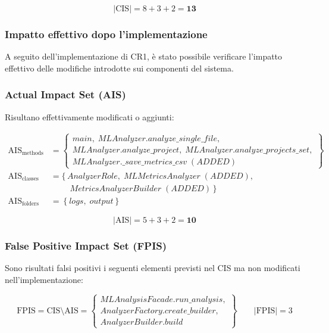 \documentclass[11pt,a4paper]{article}
\makeatletter
\newif\ifmark@prevlower
\def\mark@casebreak#1{%
  \ifcat\noexpand#1\relax
    \mark@prevlowerfalse
  \else
    \ifnum`#1=\uccode`#1\relax
      \ifmark@prevlower\allowbreak\fi
      \mark@prevlowerfalse
    \else
      \ifnum`#1=\lccode`#1\relax
        \mark@prevlowertrue
      \else
        \mark@prevlowerfalse
      \fi
    \fi
  \fi}
\def\mark@brk#1{%
  \ifx#1\mark@stop
    \let\mark@next\relax
  \else
    \mark@casebreak{#1}%
    #1%
    \ifx#1.\allowbreak\else
      \ifx#1\_\allowbreak\else
        \ifx#1/\allowbreak\else
          \ifx#1(\allowbreak\fi
        \fi
      \fi
    \fi
    \let\mark@next\mark@brk
  \fi
  \mark@next}
\def\mark@stop{\mark@stop}
\DeclareRobustCommand{\mark@code}[1]{%
  \ifmmode
    \text{\ttfamily\small\mark@prevlowerfalse\mark@brk#1\mark@stop}%
  \else
    {\ttfamily\small\mark@prevlowerfalse\mark@brk#1\mark@stop}%
  \fi}
\DeclareRobustCommand{\cls}[1]{\mark@code{#1}}
\DeclareRobustCommand{\meth}[1]{\mark@code{#1}}
\DeclareRobustCommand{\pkgpath}[1]{\mark@code{#1}}
\def\mark@code#1{#1}%
\def\cls#1{#1}%
\def\meth#1{#1}%
\def\pkgpath#1{#1}%
\newcommand{\CIS}{\textrm{CIS}}
\newcommand{\AIS}{\textrm{AIS}}
\newcommand{\FPIS}{\textrm{FPIS}}
\makeatother
\begin{document}
\begin{equation*}
  |\CIS| = 8 + 3 + 2 = \mathbf{13}
\end{equation*}

\subsubsection{Impatto effettivo dopo l'implementazione}
\label{sec:ia-cr1-impl}

A seguito dell'implementazione di CR1, \`e stato possibile verificare l'impatto
effettivo delle modifiche introdotte sui componenti del sistema.

\subsubsection*{Actual Impact Set (AIS)}

Risultano effettivamente modificati o aggiunti:

\begin{align*}
  \AIS_{\text{methods}} &= \left\{
    \begin{array}{l}
      \meth{main},\;
      \meth{MLAnalyzer.analyze\_single\_file},\\
      \meth{MLAnalyzer.analyze\_project},\;
      \meth{MLAnalyzer.analyze\_projects\_set},\\
      \meth{MLAnalyzer.\_save\_metrics\_csv}\;(\textit{ADDED})
    \end{array}
  \right\}\\[6pt]
  \AIS_{\text{classes}} &= \{\,
    \cls{AnalyzerRole},\;
    \cls{MLMetricsAnalyzer}\;(\textit{ADDED}),\\
  &\phantom{{}={}}\quad
    \cls{MetricsAnalyzerBuilder}\;(\textit{ADDED})\, \}\\[6pt]
  \AIS_{\text{folders}} &= \left\{ \pkgpath{logs},\; \pkgpath{output} \right\}
\end{align*}

\begin{equation*}
  |\AIS| = 5 + 3 + 2 = \mathbf{10}
\end{equation*}

\subsubsection*{False Positive Impact Set (FPIS)}

Sono risultati falsi positivi i seguenti elementi previsti nel CIS ma non
modificati nell'implementazione:

\begin{equation*}
  \FPIS = \CIS \setminus \AIS = \left\{
    \begin{array}{l}
      \meth{MLAnalysisFacade.run\_analysis},\\
      \meth{AnalyzerFactory.create\_builder},\\
      \meth{AnalyzerBuilder.build}
    \end{array}
  \right\}
  \qquad |\FPIS| = 3
\end{equation*}
\end{document}
